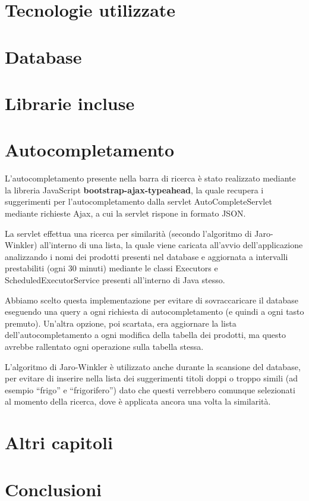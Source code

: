 
\chapter{Tecnologie utilizzate}
\lipsum
\chapter{Database}

\chapter{Librarie incluse}


\chapter{Autocompletamento}

L'autocompletamento presente nella barra di ricerca è stato realizzato mediante la libreria JavaScript  \textbf{bootstrap-ajax-typeahead}, la quale recupera i suggerimenti per l'autocompletamento dalla servlet AutoCompleteServlet mediante richieste Ajax, a cui la servlet rispone in formato JSON.

La servlet effettua una ricerca per similarità (secondo l'algoritmo di Jaro-Winkler) all'interno di una lista, la quale viene caricata all'avvio dell'applicazione analizzando i nomi dei prodotti presenti nel database e aggiornata a intervalli prestabiliti (ogni 30 minuti) mediante le classi Executors e ScheduledExecutorService presenti all'interno di Java stesso.

Abbiamo scelto questa implementazione per evitare di sovraccaricare il database eseguendo una query a ogni richiesta di autocompletamento (e quindi a ogni tasto premuto).
Un'altra opzione, poi scartata, era aggiornare la lista dell'autocompletamento a ogni modifica della tabella dei prodotti, ma questo avrebbe rallentato ogni operazione sulla tabella stessa.

L'algoritmo di Jaro-Winkler è utilizzato anche durante la scansione del database, per evitare di inserire nella lista dei suggerimenti titoli doppi o troppo simili (ad esempio ``frigo'' e ``frigorifero'') dato che questi verrebbero comunque selezionati al momento della ricerca, dove è applicata ancora una volta la similarità.

\chapter{Altri capitoli}
\chapter{Conclusioni}

